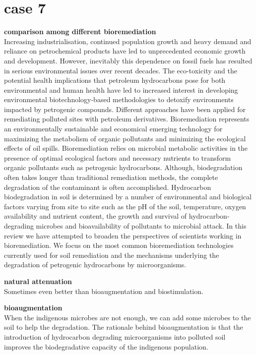 \documentclass[twocolumn]{article} %
\begin{document}
\section{case 7}
\textbf{comparison among different bioremediation}\cite{7}\\
Increasing industrialisation, continued population growth and heavy demand and reliance on petrochemical products have led to unprecedented economic growth and development. However, inevitably this dependence on fossil fuels has resulted in serious environmental issues over recent decades. The eco-toxicity and the potential health implications that petroleum hydrocarbons pose for both environmental and human health have led to increased interest in developing environmental biotechnology-based methodologies to detoxify environments impacted by petrogenic compounds. Different approaches have been applied for remediating polluted sites with petroleum derivatives. Bioremediation represents an environmentally sustainable and economical emerging technology for maximizing the metabolism of organic pollutants and minimizing the ecological effects of oil spills. Bioremediation relies on microbial metabolic activities in the presence of optimal ecological factors and necessary nutrients to transform organic pollutants such as petrogenic hydrocarbons. Although, biodegradation often takes longer than traditional remediation methods, the complete degradation of the contaminant is often accomplished. Hydrocarbon biodegradation in soil is determined by a number of environmental and biological factors varying from site to site such as the pH of the soil, temperature, oxygen availability and nutrient content, the growth and survival of hydrocarbon-degrading microbes and bioavailability of pollutants to microbial attack. In this review we have attempted to broaden the perspectives of scientists working in bioremediation. We focus on the most common bioremediation technologies currently used for soil remediation and the mechanisms underlying the degradation of petrogenic hydrocarbons by microorganisms.

\textbf{natural attenuation}\\
Sometimes even better than bioaugmentation and biostimulation.

\textbf{bioaugmentation}\\
When the indigenous microbes are not enough, we can add some microbes to the soil to help the degradation.
The rationale behind bioaugmentation is that the introduction of hydrocarbon degrading microorganisms into polluted soil improves the biodegradative capacity of the indigenous population. 
\end{document}
